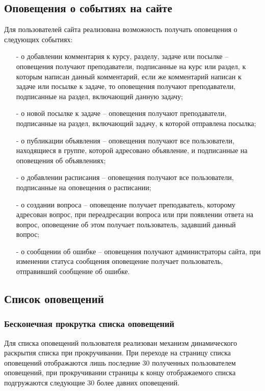 \documentclass[12pt, a4paper, oneside]{article}
\begin{document}
\subsection{Оповещения о событиях на сайте}
Для пользователей сайта реализована возможность получать оповещения о следующих событиях:
\begin{itemize}
    \item [-] о добавлении комментария к курсу, разделу, задаче или посылке – оповещения получают преподаватели, подписанные на курс или раздел, к которым написан данный комментарий, если же комментарий написан к задаче или посылке к задаче, то оповещения получают преподаватели, подписанные на раздел, включающий данную задачу;
    \item [-] о новой посылке к задаче – оповещения получают преподаватели, подписанные на раздел, включающий задачу, к которой отправлена посылка;
    \item [-] о публикации объявления – оповещения получают все пользователи, находящиеся в группе, которой адресовано объявление, и подписанные на оповещения об объявлениях;
    \item [-] о добавлении расписания – оповещения получают все пользователи, подписанные на оповещения о расписании;
    \item [-] о создании вопроса – оповещение получает преподаватель, которому адресован вопрос, при переадресации вопроса или при появлении ответа на вопрос, оповещение об этом получает пользователь, задавший данный вопрос;
    \item [-] о сообщении об ошибке – оповещения получают администраторы сайта, при изменении статуса сообщения оповещение получает пользователь, отправивший сообщение об ошибке.
\end{itemize}
\subsection{Список оповещений}
\subsubsection{Бесконечная прокрутка списка оповещений}
Для списка оповещений пользователя реализован механизм динамического раскрытия списка при прокручивании. При переходе на страницу списка оповещений отображаются лишь последние 30 полученных пользователем оповещений, при прокручивании страницы к концу отображаемого списка подгружаются следующие 30 более давних оповещений.
\end{document}

